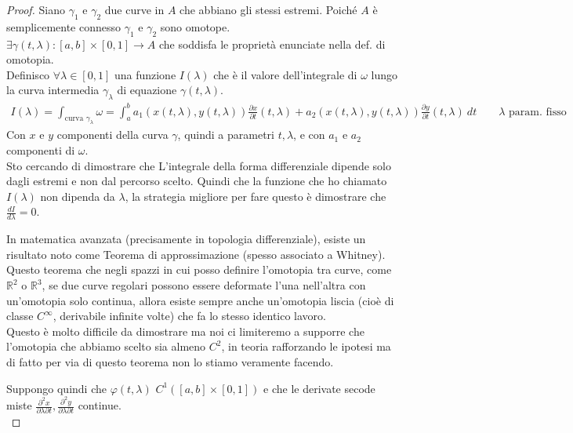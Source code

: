 \documentclass[a4paper, oneside]{article}
\newcommand\R{\mathbb{R}}
\begin{document}
\begin{proof}
    Siano $\gamma_1$ e $\gamma_2$ due curve in $A$ che abbiano gli stessi estremi. Poiché $A$ è semplicemente connesso $\gamma_1$ e $\gamma_2$ sono omotope.\\
    $\exists \gamma(t, \lambda) :[a,b]\times[0,1] \to A$ che soddisfa le proprietà enunciate nella def. di omotopia.\\
    Definisco $\forall \lambda \in [0,1]$ una funzione $I(\lambda)$ che è il valore dell'integrale di $\omega$ lungo la curva intermedia $\gamma_\lambda$ di equazione $\gamma(t, \lambda)$.
    \begin{gather*}
        I(\lambda) = \int_{\text{curva }\gamma_\lambda} \omega = \int_{a}^{b} a_1 \left( x(t,\lambda) , y (t,\lambda) \right) \frac{\partial x}{\partial t}(t,\lambda) + a_2 \left( x(t,\lambda) , y (t,\lambda) \right) \frac{\partial y}{\partial t}(t,\lambda) \ dt \qquad \lambda \text{ param. fisso}
    \end{gather*}
    Con $x$ e $y$ componenti della curva $\gamma$, quindi a parametri $t,\lambda$, e con $a_1$ e $a_2$ componenti di $\omega$.\hfill\\
    Sto cercando di dimostrare che L'integrale della forma differenziale dipende solo dagli estremi e non dal percorso scelto. Quindi che la funzione
    che ho chiamato $I(\lambda)$ non dipenda da $\lambda$, la strategia migliore per fare questo è dimostrare che $\frac{dI}{d\lambda} = 0$.\hfill\\
    \begin{aside}
        In matematica avanzata (precisamente in topologia differenziale), esiste un risultato noto come Teorema di approssimazione (spesso associato a Whitney).\\
        Questo teorema che negli spazzi in cui posso definire l'omotopia tra curve, come $\R^2$ o $\R^3$, se due curve regolari possono essere deformate l'una nell'altra con un'omotopia solo continua, allora esiste sempre anche un'omotopia liscia (cioè di classe $C^\infty$, derivabile infinite volte) che fa lo stesso identico lavoro.\\
        Questo è molto difficile da dimostrare ma noi ci limiteremo a supporre che l'omotopia che abbiamo scelto sia almeno $C^2$, in teoria rafforzando le ipotesi ma di fatto per via di questo teorema non lo stiamo veramente facendo.
    \end{aside}\noindent
    Suppongo quindi che $\varphi(t,\lambda)$  $C^1\left( [a,b] \times [0,1] \right)$ e che le derivate secode miste $\frac{\partial^2 x}{\partial \lambda \partial t}, \frac{\partial^2 y}{\partial \lambda \partial t}$  continue.\\

\end{proof}
\end{document}
